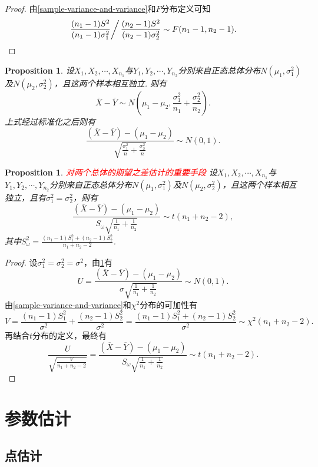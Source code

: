 \documentclass{article}
\newtheorem{proposition}[theorem]{Proposition}
\newcommand{\redt}[1]{\textcolor{red}{#1}}
\begin{document}
\begin{proof}
由\ref{sample-variance-and-variance}和$F$分布定义可知
$$
\left. \frac{(n_1-1)S^2}{(n_1-1)\sigma_1^2} \right / \frac{(n_2-1)S^2}{(n_2-1)\sigma_2^2} \sim F(n_1-1,n_2-1).
$$
\end{proof}

\begin{proposition}\label{two-sample-mean-difference}
\rm 设$X_1,X_2,\cdots,X_{n_1}$与$Y_1,Y_2,\cdots,Y_{n_2}$分别来自正态总体分布$N(\mu_1,\sigma_1^2)$及$N(\mu_2,\sigma_2^2)$，且这两个样本相互独立. 则有
$$
\overline{X} - \overline{Y} \sim N(\mu_1 -\mu_2, \frac{\sigma_1^2}{n_1} + \frac{\sigma_2^2}{n_2}).
$$
上式经过标准化之后则有
$$
\frac{(\overline{X} - \overline{Y})-(\mu_1-\mu_2)}{\sqrt{\frac{\sigma_1^2}{n} + \frac{\sigma_2^2}{n}}} \sim N(0,1).
$$
\end{proposition}

\begin{proposition}
\rm \redt{对两个总体的期望之差估计的重要手段} 设$X_1,X_2,\cdots,X_{n_1}$与$Y_1,Y_2,\cdots,Y_{n_2}$分别来自正态总体分布$N(\mu_1,\sigma_1^2)$及$N(\mu_2,\sigma_2^2)$，且这两个样本相互独立，且有$\sigma_1^2 = \sigma_2^2$，则有
$$
\frac{(\overline{X} - \overline{Y})-(\mu_1-\mu_2)}{S_\omega\sqrt{\frac{1}{n_1} + \frac{1}{n_2}}}\sim t(n_1+n_2-2),
$$
其中$S_\omega^2 = \frac{(n_1-1)S_1^2+(n_2-1)S_2^2}{n_1+n_2-2}$. 
\end{proposition}

\begin{proof}
设$\sigma_1^2 = \sigma_2^2 = \sigma^2$，由\ref{two-sample-mean-difference}有
$$
U = \frac{(\overline{X} - \overline{Y})-(\mu_1-\mu_2)}{\sigma\sqrt{\frac{1}{n_1} + \frac{1}{n_2}}} \sim N(0,1).
$$
由\ref{sample-variance-and-variance}和$\chi^2$分布的可加性有
$$
V = \frac{(n_1-1)S_1^2}{\sigma^2} + \frac{(n_2-1)S_2^2}{\sigma^2} = \frac{(n_1-1)S_1^2+(n_2-1)S_2^2}{\sigma^2} \sim \chi^2(n_1+n_2-2).   
$$
再结合$t$分布的定义，最终有
$$
\frac{U}{\sqrt{\frac{V}{n_1+n_2-2}}} = \frac{(\overline{X} - \overline{Y})-(\mu_1-\mu_2)}{S_\omega\sqrt{\frac{1}{n_1} + \frac{1}{n_2}}} \sim t(n_1+n_2-2). 
$$
\end{proof}

\newpage
\section{参数估计}

\subsection{点估计}
\end{document}
